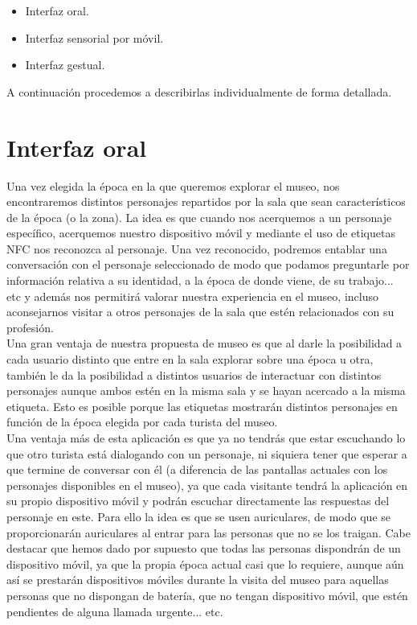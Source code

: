 \begin{itemize}
	\item Interfaz oral.
	\item Interfaz sensorial por móvil.
	\item Interfaz gestual.
\end{itemize}

A continuación procedemos a describirlas individualmente de forma detallada.

\newpage

\section{Interfaz oral}

Una vez elegida la época en la que queremos explorar el museo, nos encontraremos distintos personajes repartidos por la sala que sean característicos de la época (o la zona). La idea es que cuando nos acerquemos a un personaje específico, acerquemos nuestro dispositivo móvil y mediante el uso de etiquetas NFC nos reconozca al personaje. Una vez reconocido, podremos entablar una conversación con el personaje seleccionado de modo que podamos preguntarle por información relativa a su identidad, a la época de donde viene, de su trabajo... etc y además nos permitirá valorar nuestra experiencia en el museo, incluso aconsejarnos visitar a otros personajes de la sala que estén relacionados con su profesión.  \\ 

Una gran ventaja de nuestra propuesta de museo es que al darle la posibilidad a cada usuario distinto que entre en la sala explorar sobre una época u otra, también le da la posibilidad a distintos usuarios de interactuar con distintos personajes aunque ambos estén en la misma sala y se hayan acercado a la misma etiqueta. Esto es posible porque las etiquetas mostrarán distintos personajes en función de la época elegida por cada turista del museo. \\ 

Una ventaja más de esta aplicación es que ya no tendrás que estar escuchando lo que otro turista está dialogando con un personaje, ni siquiera tener que esperar a que termine de conversar con él (a diferencia de las pantallas actuales con los personajes disponibles en el museo), ya que cada visitante tendrá la aplicación en su propio dispositivo móvil y podrán escuchar directamente las respuestas del personaje en este. Para ello la idea es que se usen auriculares, de modo que se proporcionarán auriculares al entrar para las personas que no se los traigan. Cabe destacar que hemos dado por supuesto que todas las personas dispondrán de un dispositivo móvil, ya que la propia época actual casi que lo requiere, aunque aún así se prestarán dispositivos móviles durante la visita del museo para aquellas personas que no dispongan de batería, que no tengan dispositivo móvil, que estén pendientes de alguna llamada urgente... etc. \\

